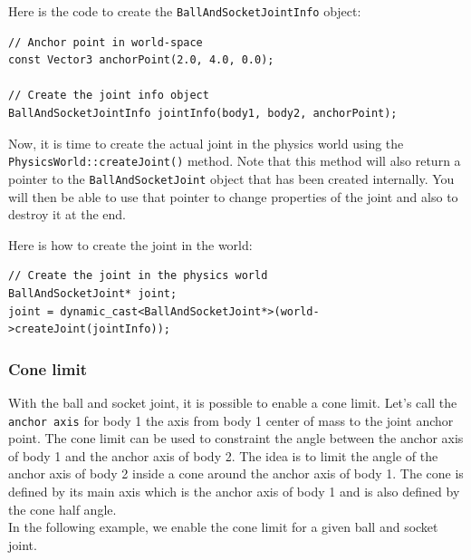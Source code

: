 \documentclass[a4paper,12pt]{article}
\begin{document}
    Here is the code to create the \texttt{BallAndSocketJointInfo} object: \\

    \begin{lstlisting}
// Anchor point in world-space
const Vector3 anchorPoint(2.0, 4.0, 0.0);

// Create the joint info object
BallAndSocketJointInfo jointInfo(body1, body2, anchorPoint);
  \end{lstlisting}

    \vspace{0.6cm}

    \begin{sloppypar}
    Now, it is time to create the actual joint in the physics world using the \texttt{PhysicsWorld::createJoint()} method.
    Note that this method will also return a pointer to the \texttt{BallAndSocketJoint} object that has been created internally. You will then
    be able to use that pointer to change properties of the joint and also to destroy it at the end. \\
    \end{sloppypar}

    Here is how to create the joint in the world: \\

    \begin{lstlisting}
// Create the joint in the physics world
BallAndSocketJoint* joint;
joint = dynamic_cast<BallAndSocketJoint*>(world->createJoint(jointInfo));
  \end{lstlisting}

    \subsubsection{Cone limit}

    With the ball and socket joint, it is possible to enable a cone limit. Let's call the \texttt{anchor axis} for body 1 the axis from body 1 center of mass
    to the joint anchor point. The cone limit can be used to constraint the angle between the anchor axis of body 1 and the anchor axis of body 2.
    The idea is to limit the angle of the anchor axis of body 2 inside a cone around the anchor axis of body 1. The cone is defined by its main axis
    which is the anchor axis of body 1 and is also defined by the cone half angle. \\

    In the following example, we enable the cone limit for a given ball and socket joint. \\
\end{document}
